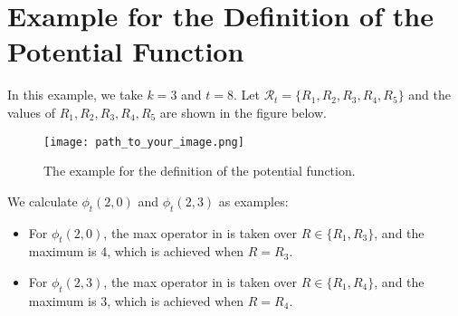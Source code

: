 \documentclass{article}
\begin{document}
\section*{Example for the Definition of the Potential Function}

In this example, we take \( k = 3 \) and \( t = 8 \). Let \( \mathcal{R}_t = \{R_1, R_2, R_3, R_4, R_5\} \) and the values of \( R_1, R_2, R_3, R_4, R_5 \) are shown in the figure below.

\begin{figure}[h]
    \centering
    \texttt{[image: path\_to\_your\_image.png]}
    \caption{The example for the definition of the potential function.}
    \label{fig:potential_function_example}
\end{figure}

We calculate \( \phi_t(2,0) \) and \( \phi_t(2,3) \) as examples:
\begin{itemize}
    \item For \( \phi_t(2,0) \), the max operator in  is taken over \( R \in \{R_1, R_3\} \), and the maximum is 4, which is achieved when \( R = R_3 \).
    \item For \( \phi_t(2,3) \), the max operator in  is taken over \( R \in \{R_1, R_4\} \), and the maximum is 3, which is achieved when \( R = R_4 \).
\end{itemize}
\end{document}
